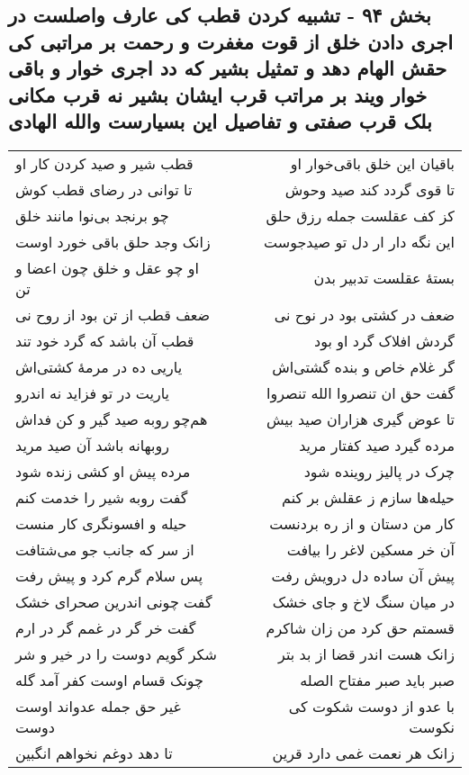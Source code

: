 \begin{center}
\section*{بخش ۹۴ - تشبیه کردن قطب کی عارف واصلست در اجری دادن خلق از قوت مغفرت و رحمت بر مراتبی کی حقش الهام دهد و تمثیل بشیر که دد اجری خوار و باقی خوار ویند بر مراتب قرب ایشان بشیر نه قرب مکانی بلک قرب صفتی و تفاصیل این بسیارست  والله الهادی}
\label{sec:sh094}
\begin{longtable}{l p{0.5cm} r}
قطب شیر و صید کردن کار او
&&
باقیان این خلق باقی‌خوار او
\\
تا توانی در رضای قطب کوش
&&
تا قوی گردد کند صید وحوش
\\
چو برنجد بی‌نوا مانند خلق
&&
کز کف عقلست جمله رزق حلق
\\
زانک وجد حلق باقی خورد اوست
&&
این نگه دار ار دل تو صیدجوست
\\
او چو عقل و خلق چون اعضا و تن
&&
بستهٔ عقلست تدبیر بدن
\\
ضعف قطب از تن بود از روح نی
&&
ضعف در کشتی بود در نوح نی
\\
قطب آن باشد که گرد خود تند
&&
گردش افلاک گرد او بود
\\
یاریی ده در مرمهٔ کشتی‌اش
&&
گر غلام خاص و بنده گشتی‌اش
\\
یاریت در تو فزاید نه اندرو
&&
گفت حق ان تنصروا الله تنصروا
\\
هم‌چو روبه صید گیر و کن فداش
&&
تا عوض گیری هزاران صید بیش
\\
روبهانه باشد آن صید مرید
&&
مرده گیرد صید کفتار مرید
\\
مرده پیش او کشی زنده شود
&&
چرک در پالیز روینده شود
\\
گفت روبه شیر را خدمت کنم
&&
حیله‌ها سازم ز عقلش بر کنم
\\
حیله و افسونگری کار منست
&&
کار من دستان و از ره بردنست
\\
از سر که جانب جو می‌شتافت
&&
آن خر مسکین لاغر را بیافت
\\
پس سلام گرم کرد و پیش رفت
&&
پیش آن ساده دل درویش رفت
\\
گفت چونی اندرین صحرای خشک
&&
در میان سنگ لاخ و جای خشک
\\
گفت خر گر در غمم گر در ارم
&&
قسمتم حق کرد من زان شاکرم
\\
شکر گویم دوست را در خیر و شر
&&
زانک هست اندر قضا از بد بتر
\\
چونک قسام اوست کفر آمد گله
&&
صبر باید صبر مفتاح الصله
\\
غیر حق جمله عدواند اوست دوست
&&
با عدو از دوست شکوت کی نکوست
\\
تا دهد دوغم نخواهم انگبین
&&
زانک هر نعمت غمی دارد قرین
\\
\end{longtable}
\end{center}
